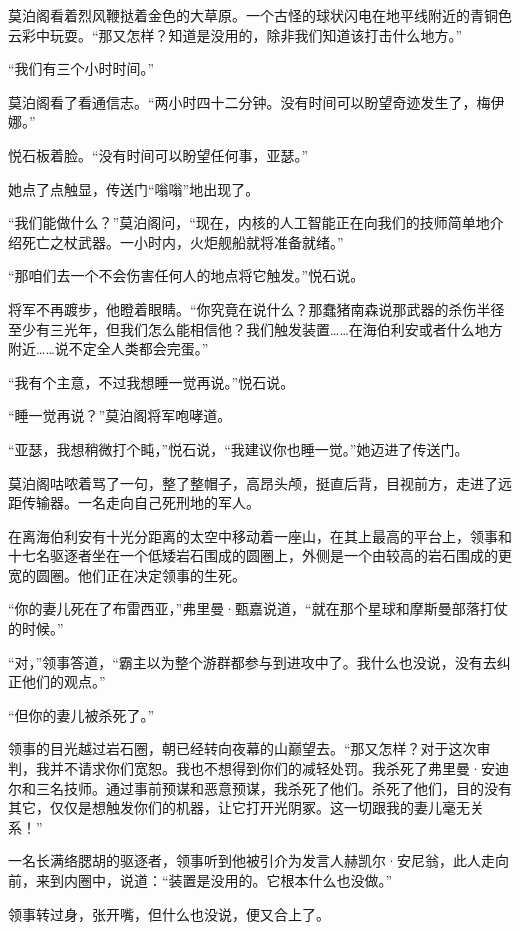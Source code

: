 \documentclass[AutoFakeBold=true]{book}
\begin{document}
莫泊阁看着烈风鞭挞着金色的大草原。一个古怪的球状闪电在地平线附近的青铜色云彩中玩耍。``那又怎样？知道是没用的，除非我们知道该打击什么地方。''

``我们有三个小时时间。''

莫泊阁看了看通信志。``两小时四十二分钟。没有时间可以盼望奇迹发生了，梅伊娜。''

悦石板着脸。``没有时间可以盼望任何事，亚瑟。''

她点了点触显，传送门``嗡嗡''地出现了。

``我们能做什么？''莫泊阁问，``现在，内核的人工智能正在向我们的技师简单地介绍死亡之杖武器。一小时内，火炬舰船就将准备就绪。''

``那咱们去一个不会伤害任何人的地点将它触发。''悦石说。

将军不再踱步，他瞪着眼睛。``你究竟在说什么？那蠢猪南森说那武器的杀伤半径至少有三光年，但我们怎么能相信他？我们触发装置……在海伯利安或者什么地方附近……说不定全人类都会完蛋。''

``我有个主意，不过我想睡一觉再说。''悦石说。

``睡一觉再说？''莫泊阁将军咆哮道。

``亚瑟，我想稍微打个盹，''悦石说，``我建议你也睡一觉。''她迈进了传送门。

莫泊阁咕哝着骂了一句，整了整帽子，高昂头颅，挺直后背，目视前方，走进了远距传输器。一名走向自己死刑地的军人。

\vspace*{1em}

在离海伯利安有十光分距离的太空中移动着一座山，在其上最高的平台上，领事和十七名驱逐者坐在一个低矮岩石围成的圆圈上，外侧是一个由较高的岩石围成的更宽的圆圈。他们正在决定领事的生死。

``你的妻儿死在了布雷西亚，''弗里曼·甄嘉说道，``就在那个星球和摩斯曼部落打仗的时候。''

``对，''领事答道，``霸主以为整个游群都参与到进攻中了。我什么也没说，没有去纠正他们的观点。''

``但你的妻儿被杀死了。''

领事的目光越过岩石圈，朝已经转向夜幕的山巅望去。``那又怎样？对于这次审判，我并不请求你们宽恕。我也不想得到你们的减轻处罚。我杀死了弗里曼·安迪尔和三名技师。通过事前预谋和恶意预谋，我杀死了他们。杀死了他们，目的没有其它，仅仅是想触发你们的机器，让它打开光阴冢。这一切跟我的妻儿毫无关系！''

一名长满络腮胡的驱逐者，领事听到他被引介为发言人赫凯尔·安尼翁，此人走向前，来到内圈中，说道：``装置是没用的。它根本什么也没做。''

领事转过身，张开嘴，但什么也没说，便又合上了。
\end{document}
